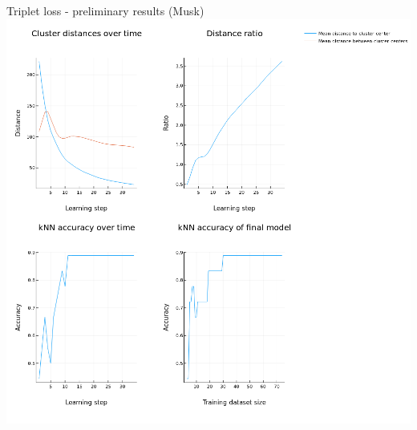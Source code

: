 \documentclass[10pt]{beamer}
\begin{document}
\begin{frame}{Triplet loss - preliminary results (Musk)}
	\centering
	\includegraphics[width=0.7\pagewidth]{images/triplet.png}
\end{frame}
\end{document}
